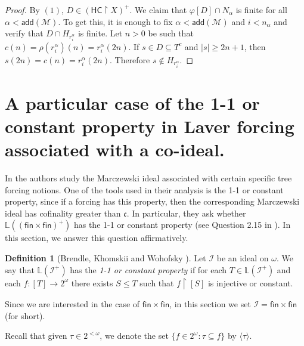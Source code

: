 \documentclass{amsart}
\theoremstyle{definition}
\newtheorem{definition}[theorem]{Definition}
\theoremstyle{remark}
\numberwithin{equation}{section}
\newcommand{\hc}{\mathsf{HC}}
\newcommand{\fin}{\mathsf{fin}}
\newcommand{\add}{\mathsf{add}}
\newcommand{\li}{\mathbb{L}(\mathcal{I}^+)}
\newcommand{\lav}{\mathbb{L}}
\newcommand{\id}{\mathcal{I}}
\newcommand{\restr}[2]{#1\upharpoonright {#2}}
\begin{document}
\begin{proof}
        By $(1)$, $D\in (\restr{\hc}{X})^+$. We claim that $\varphi[D]\cap N_\alpha$ is finite for all $\alpha<\add(\mathcal{M})$. To get this, it is enough to fix $\alpha<\add(\mathcal{M})$ and $i<n_\alpha$ and verify that $D\cap H_{r^\alpha_i}$ is finite. Let $n>0$ be such that $c(n)=\rho(r^\alpha_i)(n)=r^\alpha_i(2n)$. If $s\in D\subseteq T^c$ and $|s|\geq 2n+1$, then $s(2n)=c(n)=r^\alpha_i(2n)$. Therefore $s\notin H_{r^\alpha_i}$.
    \end{proof}



    \section{A particular case of the 1-1 or constant property in Laver forcing associated with a co-ideal.}

In \cite{poke} the authors study the Marczewski ideal associated with certain specific tree forcing notions. One of the tools used in their analysis is the 1-1 or constant property,  since if a forcing has this property, then the corresponding Marczewski ideal has cofinality greater than $\mathfrak{c}$. In particular, they ask whether $\lav((\fin \times \fin)^+)$ has the 1-1 or constant property (see Question 2.15 in \cite{poke}). In this section, we answer this question affirmatively.

\begin{definition}[Brendle, Khomskii and Wohofsky \cite{brendle}]
    Let $\id$ be an ideal on $\omega$. We say that $\li$ has the \emph{1-1 or constant property} if for each $T\in \li$ and each $f:[T]\rightarrow 2^\omega$ there exists $S\leq T$ such that $\restr{f}{[S]}$ is injective or constant.
\end{definition}

Since we are interested in the case of $\fin \times \fin$, in this section we set $\mathcal{I}=\fin \times \fin$ (for short). 

Recall that given $\tau \in 2^{<\omega}$, we denote the set $\{f\in 2^{\omega}: \tau\subseteq f \}$ by $\langle\tau \rangle$.%
\end{document}
